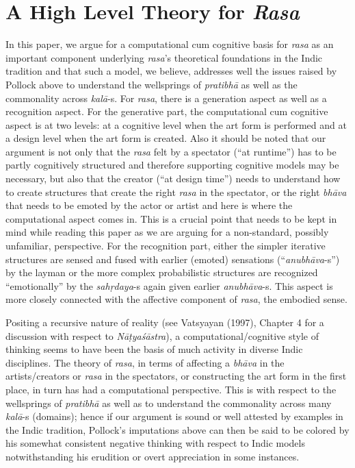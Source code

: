 \section{A High Level Theory for \textsl{Rasa}}\label{chap3-sec3}

In this paper, we argue for a computational cum cognitive basis for \textsl{rasa} as an important component underlying \textsl{rasa}’s theoretical foundations in the Indic tradition and that such a model, we believe, addresses well the issues raised by Pollock above to understand the wellsprings of \textsl{pratibhā} as well as the commonality across \textsl{kalā}-s. For \textsl{rasa}, there is a generation aspect as well as a recognition aspect. For the generative part, the computational cum cognitive aspect is at two levels: at a cognitive level when the art form is performed and at a design level when the art form is created. Also it should be noted that our argument is not only that the \textsl{rasa} felt by a spectator (“at runtime”) has to be partly cognitively structured and therefore supporting cognitive models may be necessary, but also that the creator (“at design time”) needs to understand how to create structures that create the right \textsl{rasa} in the spectator, or the right \textsl{bhāva} that needs to be emoted by the actor or artist and here is where the computational aspect comes in. This is a crucial point that needs to be kept in mind while reading this paper as we are arguing for a non-standard, possibly unfamiliar, perspective. For the recognition part, either the simpler iterative structures are sensed and fused with earlier (emoted) sensations (“\textsl{anubhāva}-s”) by the layman or the more complex probabilistic structures are recognized “emotionally” by the \textsl{sahṛdaya}-s again given earlier \textsl{anubhāva}-s. This aspect is more closely connected with the affective component of \textsl{rasa}, the embodied sense.

Positing a recursive nature of reality (see Vatsyayan (1997), Chapter 4 for a discussion with respect to \textsl{Nāṭyaśāstra}), a computational/cognitive style of thinking seems to have been the basis of much activity in diverse Indic disciplines. The theory of \textsl{rasa}, in terms of affecting a \textsl{bhāva} in the artists/creators or \textsl{rasa} in the spectators, or constructing the art form in the first place, in turn has had a computational perspective. This is with respect to the wellsprings of \textsl{pratibhā} as well as to understand the commonality across many \textsl{kalā}-s (domains); hence if our argument is sound or well attested by examples in the Indic tradition, Pollock’s imputations above can then be said to be colored by his somewhat consistent negative thinking with respect to Indic models notwithstanding his erudition or overt appreciation in some instances. 

